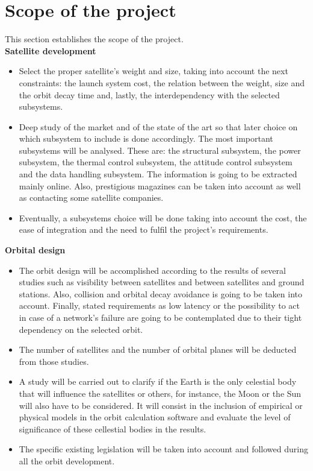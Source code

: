 \section{Scope of the project}
This section establishes the scope of the project. \\

{\bfseries Satellite development} 
\begin{itemize}
	\item Select the proper satellite’s weight and size, taking into account the next constraints: the launch system cost, the relation between the weight, size and the orbit decay time and, lastly, the interdependency with the selected subsystems.
	\item Deep study of the market and of the state of the art so that later choice on which subsystem to include is done accordingly. The most important subsystems will be analysed. These are: the structural subsystem, the power subsystem, the thermal control subsystem, the attitude control subsystem and the data handling subsystem. The information is going to be extracted mainly online. Also, prestigious magazines can be taken into account as well as contacting some satellite companies.
	\item Eventually, a subsystems choice will be done taking into account the cost, the ease of integration and the need to fulfil the project’s requirements.
\end{itemize}

{\bfseries Orbital design}

\begin{itemize}
	\item The orbit design will be accomplished according to the results of several studies such
as visibility between satellites and between satellites and ground stations. Also, collision
and orbital decay avoidance is going to be taken into account. Finally, stated requirements as low latency or the possibility to act in case of a network’s failure are going to be contemplated due to their tight dependency on the selected orbit.
	\item The number of satellites and the number of orbital planes will be deducted from those
studies.
	\item A study will be carried out to clarify if the Earth is the only celestial body that will
influence the satellites or others, for instance, the Moon or the Sun will also have to
be considered. It will consist in the inclusion of empirical or physical models in the orbit calculation software and evaluate the level of significance of these cellestial bodies in the results. 
	\item The specific existing legislation will be taken into  account and followed during all
the orbit development.

\end{itemize}

